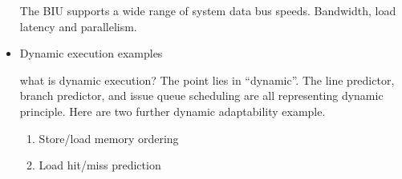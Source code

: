 \documentclass[11pt]{article}
\begin{document}
\begin{itemize}
	 The BIU supports a wide range of system data bus speeds. Bandwidth, load latency and parallelism.
	\item Dynamic execution examples
	
	what is dynamic execution? The point lies in ``dynamic''. The line predictor, branch predictor, and issue queue scheduling are all representing dynamic principle. Here are two further dynamic adaptability example.
	\begin{enumerate}
		\item Store/load memory ordering
		\item Load hit/miss prediction
	\end{enumerate}
\end{itemize}
\end{document}
